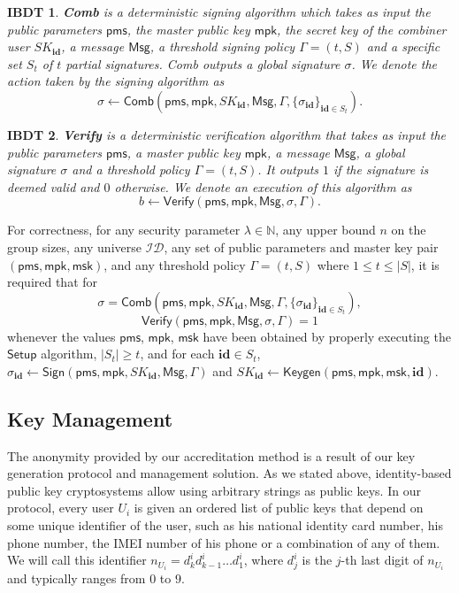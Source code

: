 \documentclass[11pt]{llncs}
\def\pms{\mathsf{pms}}
\def\msk{\mathsf{msk}}
\def\mpk{\mathsf{mpk}}
\def\Msg{\mathsf{Msg}}
\newtheorem{ibdtproto}{IBDT}
\begin{document}
\begin{ibdtproto}\label{ab.ibdtproto.comb}
\textbf{Comb} is a deterministic signing algorithm
which takes as input the public parameters $\pms$,
the master public key $\mpk$, 
the secret key of the
combiner user $SK_{\mathbf{id}}$, 
a message $\Msg$,
a threshold signing policy $\Gamma = (t,S)$ and
a specific set $S_t$ of $t$ partial signatures.
Comb outputs a global signature $\sigma$.
We denote the action taken by the signing algorithm as
$$\sigma \leftarrow \mathsf{Comb}\left(\pms, \mpk, SK_{\mathbf{id}}, \Msg, \Gamma, \{\sigma_{\mathbf{id}}\}_{\mathbf{id} \in S_t}\right).$$
\end{ibdtproto}

\begin{ibdtproto}\label{ab.ibdtproto.verify}
\textbf{Verify} is a deterministic verification algorithm
that takes as input the public parameters $\pms$,
a master public key $\mpk$, a message $\Msg$,
a global signature $\sigma$ and a threshold policy $\Gamma = (t,S)$.
It outputs $1$ if the signature is deemed valid and $0$ otherwise.
We denote an execution of this algorithm as
$$b \leftarrow \mathsf{Verify}\left(\pms, \mpk, \Msg, \sigma, \Gamma\right).$$
\end{ibdtproto}

For correctness, for any security parameter $\lambda \in \mathbb{N}$,
any upper bound $n$ on the group sizes, any universe $\mathcal{ID}$,
any set of public parameters and master key pair
$(\pms, \mpk, \msk)$,
and any threshold policy $\Gamma = (t,S)$ where $1 \le t \le |S|$, it is required that for
$$\sigma = \mathsf{Comb}\left(\pms, \mpk, SK_{\mathbf{id}}, \Msg, \Gamma, \{\sigma_{\mathbf{id}}\}_{\mathbf{id} \in S_t}\right),$$
$$ \mathsf{Verify}\left(\pms, \mpk, \Msg, \sigma, \Gamma \right) = 1$$
whenever the values $\pms$, $\mpk$, $\msk$
have been obtained by properly executing the
$\mathsf{Setup}$ algorithm, $|S_t| \ge t$, and for each
$\mathbf{id} \in S_t$,
$\sigma_{\mathbf{id}} \leftarrow \mathsf{Sign}(\pms, \mpk, SK_{\mathbf{id}}, \Msg, \Gamma)$ and
$SK_{\mathbf{id}} \leftarrow \mathsf{Keygen}(\pms, \mpk, \msk, \mathbf{id})$.


\subsection{Key Management}\label{ab.subsec.keymgnt}

The anonymity provided by our accreditation method is
a result of our key generation protocol and management solution.
As we stated above, identity-based public key cryptosystems
allow using arbitrary strings as public keys.
In our protocol, every user $U_i$ is given an ordered list
of public keys that
depend on some unique identifier of the user, such as his
national identity card number, his phone number, the
IMEI number of his phone or a combination of any of them.
We will call this identifier $n_{U_i} = d_{k}^{i} d_{k-1}^{i} \dots d_{1}^{i}$,
where $d_{j}^{i}$ is the $j$-th last digit of $n_{U_i}$
and typically ranges from $0$ to $9$.
\end{document}
